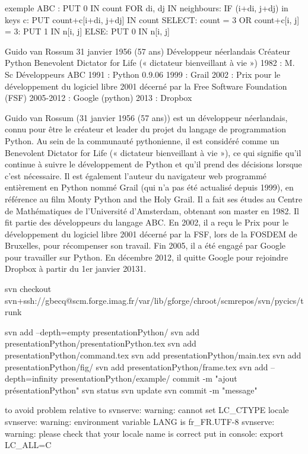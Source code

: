 exemple ABC : 
PUT 0 IN count
FOR di, dj IN neighbours:
    IF (i+di, j+dj) in keys c:
        PUT count+c[i+di, j+dj] IN count
SELECT:
    count = 3 OR count+c[i, j] = 3:
        PUT 1 IN n[i, j]
    ELSE:
        PUT 0 IN n[i, j]


Guido van Rossum 
31 janvier 1956 (57 ans)
Développeur néerlandais 
Créateur Python 
Benevolent Dictator for Life (« dictateur bienveillant à vie »)
1982 : M. Sc  
Développeurs ABC
1991 : Python 0.9.06
1999 : Grail 
2002 : Prix pour le développement du logiciel libre 2001 décerné par la Free Software Foundation (FSF)
2005-2012 : Google (python) 
2013 : Dropbox

Guido van Rossum (31 janvier 1956 (57 ans)) est un développeur néerlandais, connu pour être le créateur et leader du projet du langage de programmation Python. 
Au sein de la communauté pythonienne, il est considéré comme un Benevolent Dictator for Life (« dictateur bienveillant à vie »), ce qui signifie qu'il continue à suivre le développement de Python et qu'il prend des décisions lorsque c'est nécessaire.
Il est également l'auteur du navigateur web programmé entièrement en Python nommé Grail (qui n'a pas été actualisé depuis 1999), en référence au film Monty Python and the Holy Grail.
Il a fait ses études au Centre de Mathématiques de l’Université d'Amsterdam, obtenant son master en 1982. 
Il fit partie des développeurs du langage ABC. 
En 2002, il a reçu le Prix pour le développement du logiciel libre 2001 décerné par la FSF, lors de la FOSDEM de Bruxelles, pour récompenser son travail.
Fin 2005, il a été engagé par Google pour travailler sur Python.
En décembre 2012, il quitte Google pour rejoindre Dropbox à partir du 1er janvier 20131.






svn checkout svn+ssh://gbecq@scm.forge.imag.fr/var/lib/gforge/chroot/scmrepos/svn/pycics/trunk

svn add --depth=empty presentationPython/
svn add presentationPython/presentationPython.tex
svn add presentationPython/command.tex
svn add presentationPython/main.tex
svn add presentationPython/fig/
svn add presentationPython/frame.tex
svn add --depth=infinity presentationPython/example/
commit -m "ajout présentationPython" 
svn status
svn update
svn commit -m "message"

to avoid problem relative to 
svnserve: warning: cannot set LC_CTYPE locale
svnserve: warning: environment variable LANG is fr_FR.UTF-8
svnserve: warning: please check that your locale name is correct
put in console: 
export LC_ALL=C 

